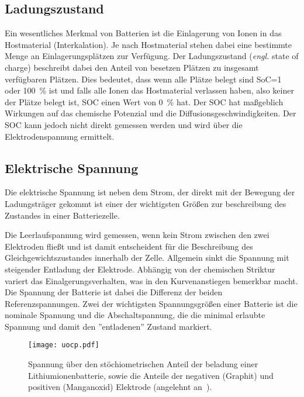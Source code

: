 \subsection{Ladungszustand}
Ein wesentliches Merkmal von Batterien ist die Einlagerung von Ionen in das Hostmaterial (Interkalation). Je nach Hostmaterial stehen dabei eine bestimmte Menge an Einlagerungsplätzen zur Verfügung. Der Ladungszustand (\textit{engl.} state of charge) beschreibt dabei den Anteil von besetzen Plätzen zu insgesamt verfügbaren Plätzen.
Dies bedeutet, dass wenn alle Plätze belegt sind SoC=1 oder 100~\% ist und falls alle Ionen das Hostmaterial verlassen haben, also keiner der Plätze belegt ist, SOC einen Wert von 0~\% hat.
Der SOC hat maßgeblich Wirkungen auf das chemische Potenzial und die Diffusionsgeschwindigkeiten. Der SOC kann jedoch nicht direkt gemessen werden und wird über die Elektrodenspannung ermittelt.


\subsection{Elektrische Spannung}

Die elektrische Spannung ist neben dem Strom, der direkt mit der Bewegung der Ladungsträger gekommt ist einer der wichtigsten Größen zur beschreibung des Zustandes in einer Batteriezelle. 

Die Leerlaufspannung wird gemessen, wenn kein Strom zwischen den zwei Elektroden fließt und ist damit entscheident für die Beschreibung des Gleichgewichtszustandes innerhalb der Zelle.
Allgemein sinkt die Spannung mit steigender Entladung der Elektrode. Abhängig von der chemischen Striktur variert das Einalgerungsverhalten, was in den Kurvenanstiegen bemerkbar macht.
Die Spannung der Batterie ist dabei die Differenz der beiden Referenzspannungen.
Zwei der wichtigsten Spannungsgrößen einer Batterie ist die nominale Spannung und die Abschaltspannung, die die minimal erlaubte Spannung und damit den ''entladenen'' Zustand markiert.

\begin{figure}[h]
        \center
	\texttt{[image: uocp.pdf]}
		\caption{\label{fig:battery_voltage}Spannung über den stöchiometrischen Anteil der beladung einer Lithiumionenbatterie, sowie die Anteile der negativen (Graphit) und positiven (Manganoxid) Elektrode (angelehnt an~\cite{Newman2021}).}
\end{figure}

